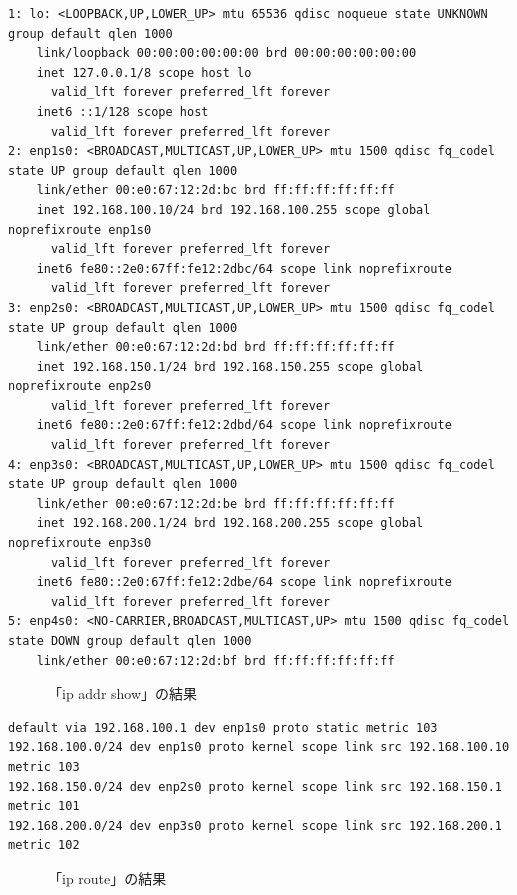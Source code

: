 \documentclass{ltjsarticle} %
\begin{document}
\begin{mdframed}
  \begin{verbatim}
1: lo: <LOOPBACK,UP,LOWER_UP> mtu 65536 qdisc noqueue state UNKNOWN group default qlen 1000
    link/loopback 00:00:00:00:00:00 brd 00:00:00:00:00:00
    inet 127.0.0.1/8 scope host lo
      valid_lft forever preferred_lft forever
    inet6 ::1/128 scope host
      valid_lft forever preferred_lft forever
2: enp1s0: <BROADCAST,MULTICAST,UP,LOWER_UP> mtu 1500 qdisc fq_codel state UP group default qlen 1000
    link/ether 00:e0:67:12:2d:bc brd ff:ff:ff:ff:ff:ff
    inet 192.168.100.10/24 brd 192.168.100.255 scope global noprefixroute enp1s0
      valid_lft forever preferred_lft forever
    inet6 fe80::2e0:67ff:fe12:2dbc/64 scope link noprefixroute
      valid_lft forever preferred_lft forever
3: enp2s0: <BROADCAST,MULTICAST,UP,LOWER_UP> mtu 1500 qdisc fq_codel state UP group default qlen 1000
    link/ether 00:e0:67:12:2d:bd brd ff:ff:ff:ff:ff:ff
    inet 192.168.150.1/24 brd 192.168.150.255 scope global noprefixroute enp2s0
      valid_lft forever preferred_lft forever
    inet6 fe80::2e0:67ff:fe12:2dbd/64 scope link noprefixroute
      valid_lft forever preferred_lft forever
4: enp3s0: <BROADCAST,MULTICAST,UP,LOWER_UP> mtu 1500 qdisc fq_codel state UP group default qlen 1000
    link/ether 00:e0:67:12:2d:be brd ff:ff:ff:ff:ff:ff
    inet 192.168.200.1/24 brd 192.168.200.255 scope global noprefixroute enp3s0
      valid_lft forever preferred_lft forever
    inet6 fe80::2e0:67ff:fe12:2dbe/64 scope link noprefixroute
      valid_lft forever preferred_lft forever
5: enp4s0: <NO-CARRIER,BROADCAST,MULTICAST,UP> mtu 1500 qdisc fq_codel state DOWN group default qlen 1000
    link/ether 00:e0:67:12:2d:bf brd ff:ff:ff:ff:ff:ff
  \end{verbatim}
  \end{mdframed}
  \begin{figure}[H]
  \caption{「ip addr show」の結果}
  \label{fig:addr_show}
\end{figure}

\begin{mdframed}
  \begin{verbatim}
default via 192.168.100.1 dev enp1s0 proto static metric 103
192.168.100.0/24 dev enp1s0 proto kernel scope link src 192.168.100.10 metric 103
192.168.150.0/24 dev enp2s0 proto kernel scope link src 192.168.150.1 metric 101
192.168.200.0/24 dev enp3s0 proto kernel scope link src 192.168.200.1 metric 102
  \end{verbatim}
  \end{mdframed}
  \begin{figure}[H]
  \caption{「ip route」の結果}
  \label{fig:route}
\end{figure}
\end{document}

